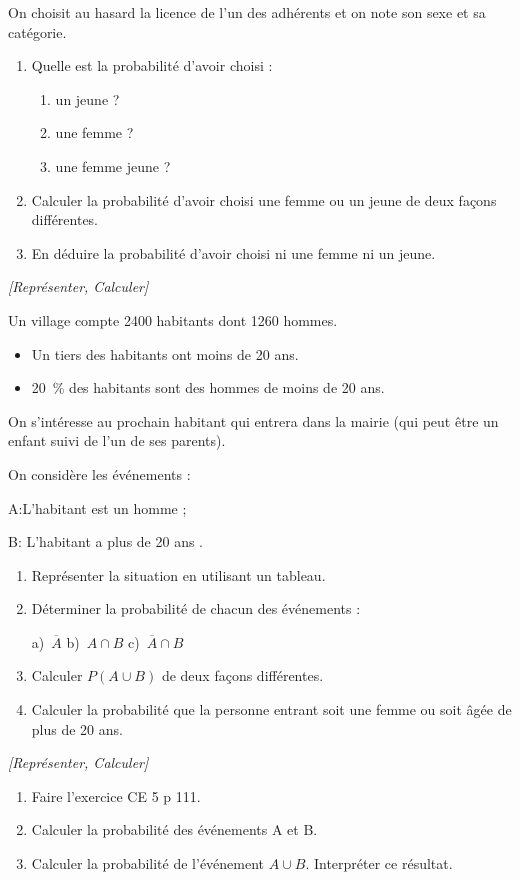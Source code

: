 On choisit au hasard la licence de l'un des adhérents et on note son sexe et sa catégorie.

\begin{enumerate}
\item Quelle est la probabilité d'avoir choisi :
\begin{enumerate} [label=\alph*)]
\item un jeune ?
\item une femme ?
\item une femme jeune ?
\end{enumerate}
\item Calculer la probabilité d'avoir choisi une femme ou un jeune de deux façons différentes.
\item En déduire la probabilité d'avoir choisi ni une femme ni un jeune.
\end{enumerate}


\exo \textit{[Représenter, Calculer]}

Un village compte 2400 habitants dont 1260 hommes.

\begin{itemize}
\item Un tiers des habitants ont moins de 20 ans.

\item 20~\% des habitants sont des hommes de moins de 20 ans.

\end{itemize}


\medskip

On s'intéresse au prochain habitant qui entrera dans la mairie (qui peut être un enfant suivi de l'un de ses parents). 

\medskip

On considère les événements :

A:\og L'habitant est un homme \fg{};

B: \og L'habitant a plus de 20 ans \fg{}.

\begin{enumerate}
\item Représenter la situation en utilisant un tableau.
\item Déterminer la probabilité de chacun des événements :

a)~$\overline{A}$ \hspace{1cm} b)~$A \cap B$ \hspace{1cm} c)~$\overline{A} \cap B$ 
\item Calculer $P(A \cup B)$ de deux façons différentes.
\item Calculer la probabilité que la personne entrant soit une femme ou soit âgée de plus de 20 ans.
\end{enumerate}  

\exo \textit{[Représenter, Calculer]}

\begin{enumerate}
\item Faire l'exercice CE 5 p 111.
\item Calculer la probabilité des événements A et B.
\item Calculer la probabilité de l'événement $A \cup B$. Interpréter ce résultat.
\end{enumerate}







